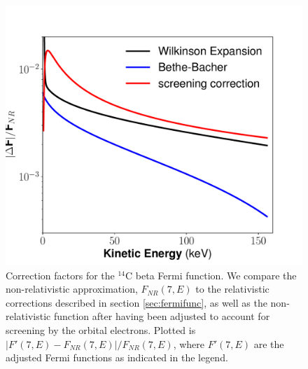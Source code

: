\begin{figure}[h!]
\centering
\includegraphics[width=\textwidth]{Figures/FermiFunc_compare.pdf}
\caption{Correction factors for the $^{14}$C beta Fermi function. We compare the non-relativistic approximation, $F_{NR}(7,E)$ to the relativistic corrections described in section \ref{sec:fermifunc}, as well as the non-relativistic function after having been adjusted to account for screening by the orbital electrons. Plotted is $|F'(7,E)-F_{NR}(7,E)|/F_{NR}(7,E)$, where $F'(7,E)$ are the adjusted Fermi functions as indicated in the legend.} 
\label{fig:C14_spec_corrs}
\end{figure}

